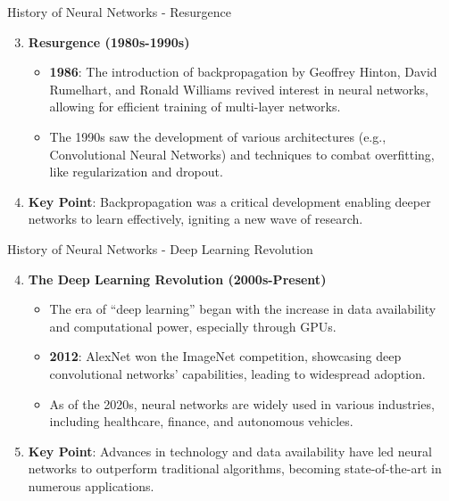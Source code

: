 \documentclass[aspectratio=169]{beamer}
\begin{document}
\begin{frame}[fragile]{History of Neural Networks - Resurgence}
    \begin{enumerate}
        \setcounter{enumi}{2}
        \item \textbf{Resurgence (1980s-1990s)}
            \begin{itemize}
                \item \textbf{1986}: The introduction of backpropagation by Geoffrey Hinton, David Rumelhart, and Ronald Williams revived interest in neural networks, allowing for efficient training of multi-layer networks.
                \item The 1990s saw the development of various architectures (e.g., Convolutional Neural Networks) and techniques to combat overfitting, like regularization and dropout.
            \end{itemize}
        \item \textbf{Key Point}: Backpropagation was a critical development enabling deeper networks to learn effectively, igniting a new wave of research.
    \end{enumerate}
\end{frame}

\begin{frame}[fragile]{History of Neural Networks - Deep Learning Revolution}
    \begin{enumerate}
        \setcounter{enumi}{3}
        \item \textbf{The Deep Learning Revolution (2000s-Present)}
            \begin{itemize}
                \item The era of “deep learning” began with the increase in data availability and computational power, especially through GPUs.
                \item \textbf{2012}: AlexNet won the ImageNet competition, showcasing deep convolutional networks' capabilities, leading to widespread adoption.
                \item As of the 2020s, neural networks are widely used in various industries, including healthcare, finance, and autonomous vehicles.
            \end{itemize}
        \item \textbf{Key Point}: Advances in technology and data availability have led neural networks to outperform traditional algorithms, becoming state-of-the-art in numerous applications.
    \end{enumerate}
\end{frame}
\end{document}
